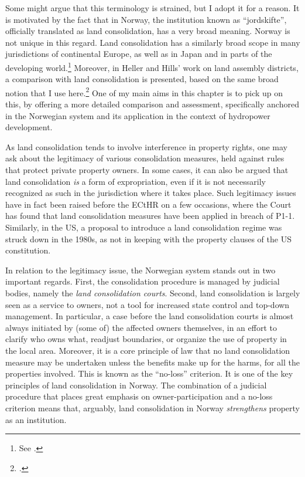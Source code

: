 Some might argue that this terminology is strained, but I adopt it for a reason. It is motivated by the fact that in Norway, the institution known as ``jordskifte'', officially translated as land consolidation, has a very broad meaning. Norway is not unique in this regard. Land consolidation has a similarly broad scope in many jurisdictions of continental Europe, as well as in Japan and in parts of the developing world.\footnote{See \cite{sky07,vitikainen04}.} Moreover, in Heller and Hills' work on land assembly districts, a comparison with land consolidation is presented, based on the same broad notion that I use here.\footcite{heller08} One of my main aims in this chapter is to pick up on this, by offering a more detailed comparison and assessment, specifically anchored in the Norwegian system and its application in the context of hydropower development.

As land consolidation tends to involve interference in property rights, one may ask about the legitimacy of various consolidation measures, held against rules that protect private property owners. In some cases, it can also be argued that land consolidation {\it is } a form of expropriation, even if it is not necessarily recognized as such in the jurisdiction where it takes place. Such legitimacy issues have in fact been raised before the ECtHR on a few occasions, where the Court has found that land consolidation measures have been applied in breach of P1-1. Similarly, in the US, a proposal to introduce a land consolidation regime was struck down in the 1980s, as not in keeping with the property clauses of the US constitution.


In relation to the legitimacy issue, the Norwegian system stands out in two important regards. First, the consolidation procedure is managed by judicial bodies, namely the {\it land consolidation courts}. Second, land consolidation is largely seen as a service to owners, not a tool for increased state control and top-down management. In particular, a case before the land consolidation courts is almost always initiated by (some of) the affected owners themselves, in an effort to clarify who owns what, readjust boundaries, or organize the use of property in the local area. Moreover, it is a core principle of law that no land consolidation measure may be undertaken unless the benefits make up for the harms, for all the properties involved. This is known as the ``no-loss'' criterion. It is one of the key principles of land consolidation in Norway. The combination of a judicial procedure that places great emphasis on owner-participation and a no-loss criterion means that, arguably, land consolidation in Norway {\it strengthens} property as an institution. 

